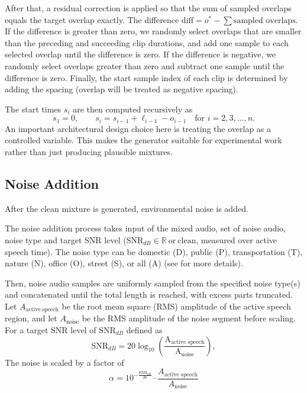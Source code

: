 After that, a residual correction is applied so that the sum of sampled overlaps equals the target overlap exactly. The difference $\mathrm{diff} = o^* - \sum\text{sampled overlaps}$. If the difference is greater than zero, we randomly select overlaps that are smaller than the preceding and succeeding clip durations, and add one sample to each selected overlap until the difference is zero. If the difference is negative, we randomly select overlaps greater than zero and subtract one sample until the difference is zero.
Finally, the start sample index of each clip is determined by adding the spacing (overlap will be 
treated as negative spacing). 

The start times $s_i$ are then computed recursively as
\begin{equation}
s_1 = 0, \qquad s_{i} = s_{i-1} + \ell_{i-1} - o_{i-1} \quad \text{for } i=2,3,\dots,n.
\end{equation}
An important architectural design choice here is treating the overlap as a controlled variable. This makes the generator suitable for experimental work rather than just producing plausible mixtures.

\subsection{Noise Addition}
After the clean mixture is generated, environmental noise is added.

The noise addition process takes input of the mixed audio, set of noise audio, noise type and target SNR level ($\mathrm{SNR}_{dB} \in \mathbb{R} ~\text{or}~ \text{clean}$, measured over active speech time). The noise type can be domestic (D), public (P), transportation (T), nature (N), office (O), street (S), or all (A) (see  for more details). 

Then, noise audio samples are uniformly sampled from the specified noise type(s) and concatenated until the total length is reached, with excess parts truncated. Let $A_\mathrm{active~speech}$ be the root mean square (RMS) amplitude of the active speech region, and let $A_\mathrm{noise}$ be the RMS amplitude of the noise segment before scaling. For a target SNR level of $\mathrm{SNR}_{dB}$ defined as
\begin{equation}
\mathrm{SNR}_{dB} = 20 \log_{10}\left(\frac{\text{A}_\text{active speech}}{\text{A}_\text{noise}}\right),
\end{equation}
The noise is scaled by a factor of
\begin{equation}
\alpha = 10^{-\frac{\mathrm{SNR}_{dB}}{20}} \cdot \frac{A_\text{active speech}}{A_\text{noise}}
\label{eq:noise_scaling}
\end{equation}


